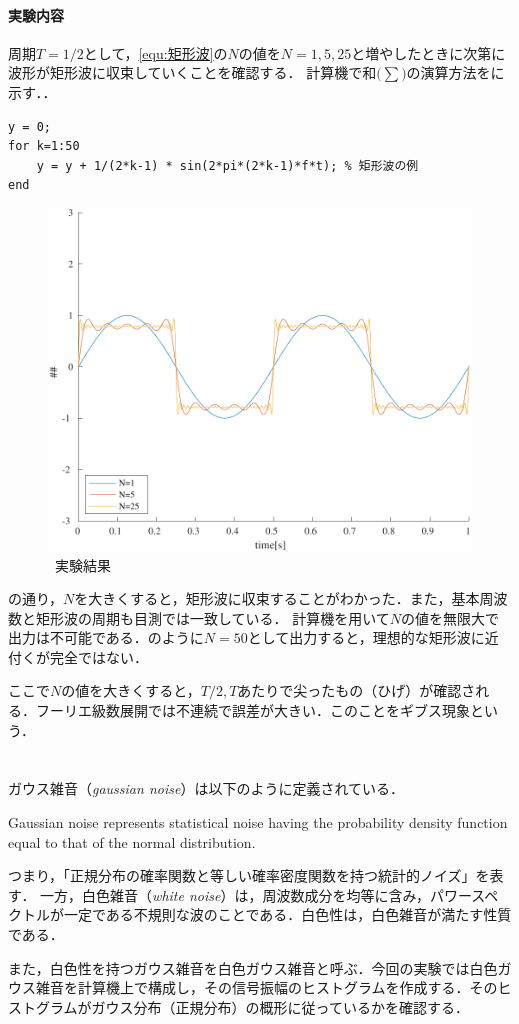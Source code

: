 \paragraph{実験内容}周期\(T=1/2\)として，\eqref{equ:矩形波}の\(N\)の値を\(N=1, 5, 25\)と増やしたときに次第に波形が矩形波に収束していくことを確認する．
計算機で和\(\big(\sum\big)\)の演算方法をに示す．\scall{}．
\begin{lstlisting}[caption={和の演算},label={src:和の演算},numbers={none}]
y = 0;
for k=1:50
    y = y + 1/(2*k-1) * sin(2*pi*(2*k-1)*f*t); % 矩形波の例
end
\end{lstlisting}
\result
\begin{figure}
    \centering
    \vspace{-2cm}
    \includegraphics[keepaspectratio,width=.3\textwidth]{../../Figures/01_04_2.pdf}
    \caption{\kadaiad\ 実験結果}
    \label{fig:\kadaiae_実験結果}
    \vspace{-2cm}
\end{figure}
の通り，\(N\)を大きくすると，矩形波に収束することがわかった．また，基本周波数と矩形波の周期も目測では一致している．
\consideration
計算機を用いて\(N\)の値を無限大で出力は不可能である．のように\(N=50\)として出力すると，理想的な矩形波に近付くが完全ではない．\par
ここで\(N\)の値を大きくすると，\(T/2, T\)あたりで尖ったもの（ひげ）が確認される．フーリエ級数展開では不連続で誤差が大きい．このことをギブス現象という\cite[p.34]{信号処理}．
\section{\kadaiae}\label{sec:\kadaiae}
\purpose
ガウス雑音（\textit{gaussian noise}）は以下のように定義されている．
\begin{leftbar}
    Gaussian noise represents statistical noise having the probability density function equal to that of the normal distribution.
    \hfill\cite{barbu2013variational}
\end{leftbar}
つまり，「正規分布の確率関数と等しい確率密度関数を持つ統計的ノイズ」を表す．
一方，白色雑音（\textit{white noise}）は，周波数成分を均等に含み，パワースペクトルが一定である不規則な波のことである\cite{witenoise}．白色性は，白色雑音が満たす性質である．\par
また，白色性を持つガウス雑音を白色ガウス雑音と呼ぶ．今回の実験では白色ガウス雑音を計算機上で構成し，その信号振幅のヒストグラムを作成する．そのヒストグラムがガウス分布（正規分布）の概形に従っているかを確認する．

